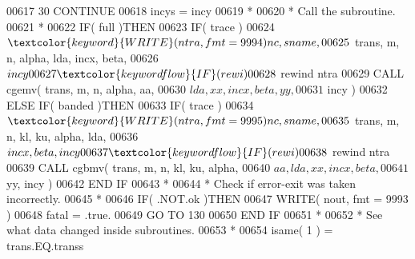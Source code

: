 \begin{DoxyCode}
00617    30                         \textcolor{keywordflow}{CONTINUE}
00618                               incys = incy
00619 \textcolor{comment}{*}
00620 \textcolor{comment}{*                             Call the subroutine.}
00621 \textcolor{comment}{*}
00622                               \textcolor{keywordflow}{IF}( full )\textcolor{keywordflow}{THEN}
00623                                  \textcolor{keywordflow}{IF}( trace )
00624      $                              \textcolor{keyword}{WRITE}( ntra, fmt = 9994 )nc, sname,
00625      $                              trans, m, n, alpha, lda, incx, beta,
00626      $                              incy
00627                                  \textcolor{keywordflow}{IF}( rewi )
00628      $                              rewind ntra
00629                                  \textcolor{keyword}{CALL }cgemv( trans, m, n, alpha, aa,
00630      $                                       lda, xx, incx, beta, yy,
00631      $                                       incy )
00632                               \textcolor{keywordflow}{ELSE} \textcolor{keywordflow}{IF}( banded )\textcolor{keywordflow}{THEN}
00633                                  \textcolor{keywordflow}{IF}( trace )
00634      $                              \textcolor{keyword}{WRITE}( ntra, fmt = 9995 )nc, sname,
00635      $                              trans, m, n, kl, ku, alpha, lda,
00636      $                              incx, beta, incy
00637                                  \textcolor{keywordflow}{IF}( rewi )
00638      $                              rewind ntra
00639                                  \textcolor{keyword}{CALL }cgbmv( trans, m, n, kl, ku, alpha,
00640      $                                       aa, lda, xx, incx, beta,
00641      $                                       yy, incy )
00642 \textcolor{keywordflow}{                              END IF}
00643 \textcolor{comment}{*}
00644 \textcolor{comment}{*                             Check if error-exit was taken incorrectly.}
00645 \textcolor{comment}{*}
00646                               \textcolor{keywordflow}{IF}( .NOT.ok )\textcolor{keywordflow}{THEN}
00647                                  \textcolor{keyword}{WRITE}( nout, fmt = 9993 )
00648                                  fatal = .true.
00649                                  \textcolor{keywordflow}{GO TO} 130
00650 \textcolor{keywordflow}{                              END IF}
00651 \textcolor{comment}{*}
00652 \textcolor{comment}{*                             See what data changed inside subroutines.}
00653 \textcolor{comment}{*}
00654                               isame( 1 ) = trans.EQ.transs

\end{DoxyCode}
